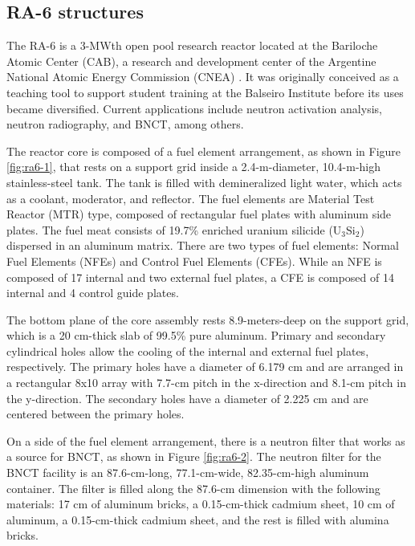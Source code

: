 \subsection{RA-6 structures}

The RA-6 is a 3-MWth open pool research reactor located at the Bariloche Atomic Center (CAB), a research and development center of the Argentine National Atomic Energy Commission (CNEA) \cite{ICSBEP}.
It was originally conceived as a teaching tool to support student training at the Balseiro Institute before its uses became diversified.
Current applications include neutron activation analysis, neutron radiography, and \gls*{BNCT}, among others.

The reactor core is composed of a fuel element arrangement, as shown in Figure \ref{fig:ra6-1}, that rests on a support grid inside a 2.4-m-diameter, 10.4-m-high stainless-steel tank.
The tank is filled with demineralized light water, which acts as a coolant, moderator, and reflector.
The fuel elements are Material Test Reactor (MTR) type, composed of rectangular fuel plates with aluminum side plates.
The fuel meat consists of 19.7\% enriched uranium silicide (U$_3$Si$_2$) dispersed in an aluminum matrix.
There are two types of fuel elements: Normal Fuel Elements (NFEs) and Control Fuel Elements (CFEs).
While an NFE is composed of 17 internal and two external fuel plates, a CFE is composed of 14 internal and 4 control guide plates.

The bottom plane of the core assembly rests 8.9-meters-deep on the support grid, which is a 20 cm-thick slab of 99.5\% pure aluminum.
Primary and secondary cylindrical holes allow the cooling of the internal and external fuel plates, respectively.
The primary holes have a diameter of 6.179 cm and are arranged in a rectangular 8x10 array with 7.7-cm pitch in the x-direction and 8.1-cm pitch in the y-direction.
The secondary holes have a diameter of 2.225 cm and are centered between the primary holes.

On a side of the fuel element arrangement, there is a neutron filter that works as a source for \gls*{BNCT}, as shown in Figure \ref{fig:ra6-2}.
The neutron filter for the \gls*{BNCT} facility is an 87.6-cm-long, 77.1-cm-wide, 82.35-cm-high aluminum container.
The filter is filled along the 87.6-cm dimension with the following materials: 17 cm of aluminum bricks, a 0.15-cm-thick cadmium sheet, 10 cm of aluminum, a 0.15-cm-thick cadmium sheet, and the rest is filled with alumina bricks.

